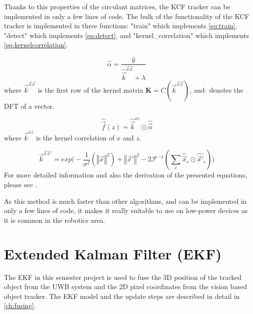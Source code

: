 Thanks to this properties of the circulant matrices, the \ac{KCF} tracker can be implemented in only a few lines of code. The bulk of the functionality of the \ac{KCF} tracker is implemented in three functions: "train" which implements \autoref{eq:train}, "detect" which implements \autoref{eq:detect}, and "kernel\_correlation" which implements \autoref{eq:kernelcorrelation}.

\begin{equation}\label{eq:train}
	\hat{\alpha} = \frac{\hat{y}}{\hat{\vec{k}}^{\vec x \vec x} + \lambda}
\end{equation}
where $\vec{k}^{\vec x \vec x}$ is the first row of the kernel matrix $\textbf{K}=C(\vec{k}^{\vec x \vec x})$, and $\hat{}$ denotes the DFT of a vector.

\begin{equation}\label{eq:detect}
	\hat{\vec f}(z) = \hat{\vec k}^{xz} \odot \hat{\vec \alpha}
\end{equation}
where $\vec k^{xz}$ is the kernel correlation of $x$ and $z$.

\begin{equation}\label{eq:kernelcorrelation}
	\vec{k}^{\vec x\vec x'} = \mathit{exp} \big( -\frac{1}{\sigma^2} (\left\Vert \vec x \right\Vert^2) + \left\Vert \vec x' \right\Vert^2 -2\mathcal{F}^{-1}(\sum_c \hat{\vec x}_c \odot \hat{\vec x'}_c) \big)
\end{equation}
For more detailed information and also the derivation of the presented equations, please see \cite{henriques2015tracking}.

As this method is much faster than other algorithms, and can be implemented in only a few lines of code, it makes it really suitable to use on low-power devices as it is common in the robotics area.

\section{Extended Kalman Filter (EKF)}
The \acf{EKF} \cite{Chui2009} in this semester project is used to fuse the 3D position of the tracked object from the \ac{UWB} system and the 2D pixel coordinates from the vision based object tracker. The \ac{EKF} model and the update steps are described in detail in \autoref{ch:fusing}.